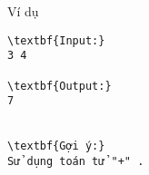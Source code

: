 Ví dụ
\begin{verbatim}
\textbf{Input:}
3 4

\textbf{Output:}
7


\textbf{Gợi ý:}
Sử dụng toán tử "+" .
\end{verbatim}
